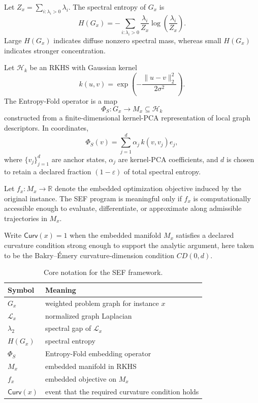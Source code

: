 \documentclass{svjour3}
\begin{document}
\begin{definition}
Let $Z_x=\sum_{i:\lambda_i>0}\lambda_i$. The spectral entropy of $G_x$ is
\[
H(G_x)= -\sum_{i:\lambda_i>0}\frac{\lambda_i}{Z_x}\log\!\left(\frac{\lambda_i}{Z_x}\right).
\]
Large $H(G_x)$ indicates diffuse nonzero spectral mass, whereas small $H(G_x)$ indicates stronger concentration.
\end{definition}

\begin{definition}
Let $\mathcal{H}_k$ be an RKHS with Gaussian kernel
\[
k(u,v)=\exp\!\left(-\frac{\|u-v\|_2^2}{2\sigma^2}\right).
\]
The Entropy-Fold operator is a map
\[
\Phi_S:G_x\longrightarrow M_x\subseteq \mathcal{H}_k
\]
constructed from a finite-dimensional kernel-PCA representation of local graph descriptors. In coordinates,
\[
\Phi_S(v)=\sum_{j=1}^{d}\alpha_j\,k(v,v_j)e_j,
\]
where $\{v_j\}_{j=1}^d$ are anchor states, $\alpha_j$ are kernel-PCA coefficients, and $d$ is chosen to retain a declared fraction $(1-\varepsilon)$ of total spectral entropy.
\end{definition}

\begin{definition}
Let $f_x: M_x \to \mathbb{R}$ denote the embedded optimization objective induced by the original instance. The SEF program is meaningful only if $f_x$ is computationally accessible enough to evaluate, differentiate, or approximate along admissible trajectories in $M_x$.
\end{definition}

\begin{definition}
Write $\mathsf{Curv}(x)=1$ when the embedded manifold $M_x$ satisfies a declared curvature condition strong enough to support the analytic argument, here taken to be the Bakry--\'Emery curvature-dimension condition $CD(0,d)$.
\end{definition}

\begin{table}[t]
\centering
\small
\caption{Core notation for the SEF framework.}
\label{tab:sef-notation}
\begin{tabular}{ll}
\toprule
Symbol & Meaning \\
\midrule
$G_x$ & weighted problem graph for instance $x$ \\
$\mathcal{L}_x$ & normalized graph Laplacian \\
$\lambda_2$ & spectral gap of $\mathcal{L}_x$ \\
$H(G_x)$ & spectral entropy \\
$\Phi_S$ & Entropy-Fold embedding operator \\
$M_x$ & embedded manifold in RKHS \\
$f_x$ & embedded objective on $M_x$ \\
$\mathsf{Curv}(x)$ & event that the required curvature condition holds \\
\bottomrule
\end{tabular}
\end{table}
\end{document}
